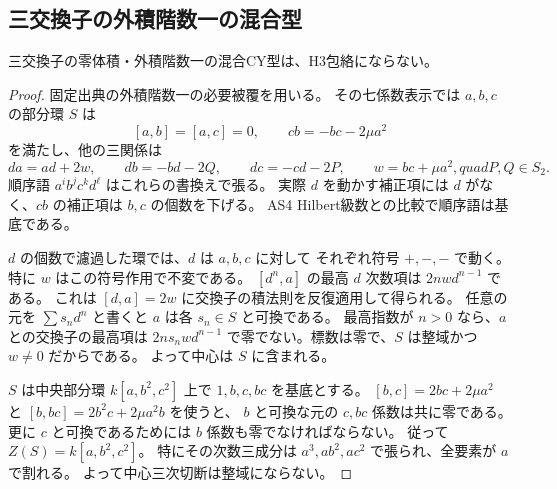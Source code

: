 \subsection{三交換子の外積階数一の混合型}
\begin{proposition}\label{prop:cubic-CY-three-mixed-rank-one-empty}
三交換子の零体積・外積階数一の混合CY型は、H3包絡にならない。
\end{proposition}
\begin{proof}
固定出典\cite{AS4CYpinned}の外積階数一の必要被覆を用いる。
その七係数表示では $a,b,c$ の部分環 $S$ は
\[
 [a,b]=[a,c]=0,\qquad cb=-bc-2\mu a^2
\]
を満たし、他の三関係は
\[
 da=ad+2w,\qquad db=-bd-2Q,\qquad dc=-cd-2P,
 \qquad w=bc+\mu a^2,quad P,Q\in S_2 .
\]
順序語 $a^i b^j c^k d^\ell$ はこれらの書換えで張る。
実際 $d$ を動かす補正項には $d$ がなく、$cb$ の補正項は $b,c$ の個数を下げる。
AS4 Hilbert級数との比較で順序語は基底である。

$d$ の個数で濾過した環では、$d$ は $a,b,c$ に対して
それぞれ符号 $+,-,-$ で動く。特に $w$ はこの符号作用で不変である。
$[d^n,a]$ の最高 $d$ 次数項は $2n w d^{n-1}$ である。
これは $[d,a]=2w$ に交換子の積法則を反復適用して得られる。
任意の元を $\sum s_n d^n$ と書くと $a$ は各 $s_n\in S$ と可換である。
最高指数が $n>0$ なら、$a$ との交換子の最高項は
$2n s_n w d^{n-1}$ で零でない。標数は零で、$S$ は整域かつ $w\ne0$ だからである。
よって中心は $S$ に含まれる。

$S$ は中央部分環 $k[a,b^2,c^2]$ 上で $1,b,c,bc$ を基底とする。
$[b,c]=2bc+2\mu a^2$ と $[b,bc]=2b^2c+2\mu a^2b$ を使うと、
$b$ と可換な元の $c,bc$ 係数は共に零である。
更に $c$ と可換であるためには $b$ 係数も零でなければならない。
従って $Z(S)=k[a,b^2,c^2]$。
特にその次数三成分は $a^3,ab^2,ac^2$ で張られ、全要素が $a$ で割れる。
よって中心三次切断は整域にならない。
\end{proof}

